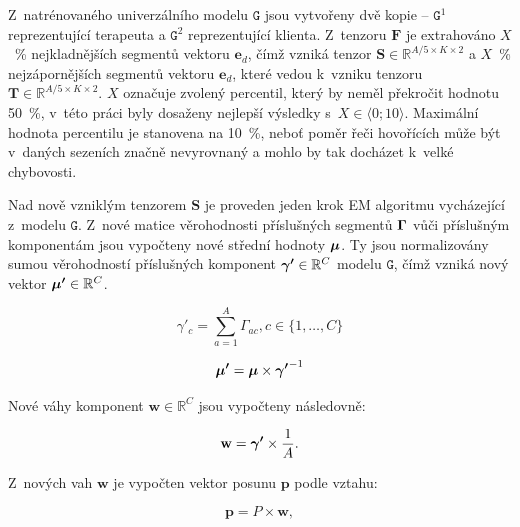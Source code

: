 \begin{enumerate}
    Z~natrénovaného univerzálního modelu $\mathtt{G}$ jsou vytvořeny dvě kopie -- $\mathtt{G}^{1}$ reprezentující terapeuta a $\mathtt{G}^{2}$ reprezentující klienta. Z~tenzoru $\mathbf{F}$ je extrahováno $X$~\% nejkladnějších segmentů vektoru $\mathbf{e}_{d}$, čímž vzniká tenzor $\mathbf{S} \in \mathbb{R}^{A/5 \times K \times 2}$ a $X$~\% nejzápornějších segmentů vektoru $\mathbf{e}_{d}$, které vedou k~vzniku tenzoru $\mathbf{T} \in \mathbb{R}^{A/5 \times K \times 2}$. $X$ označuje zvolený percentil, který by neměl překročit hodnotu 50~\%, v~této práci byly dosaženy nejlepší výsledky s~$X \in \langle 0;10\rangle$. Maximální hodnota percentilu je stanovena na 10~\%, neboť poměr řeči hovořících může být v~daných sezeních značně nevyrovnaný a mohlo by tak docházet k~velké chybovosti. 
    
    Nad nově vzniklým tenzorem $\mathbf{S}$ je proveden jeden krok EM algoritmu vycházející z~modelu $\mathtt{G}$. Z~nové matice věrohodnosti příslušných segmentů $\text{\boldmath$\Gamma$}$ vůči příslušným komponentám jsou vypočteny nové střední hodnoty $\text{\boldmath$\mu$}$. Ty jsou normalizovány sumou věrohodností příslušných komponent $\text{\boldmath$\gamma'$} \in \mathbb{R}^{C}$ modelu $\mathtt{G}$, čímž vzniká nový vektor $\text{\boldmath$\mu'$} \in \mathbb{R}^{C}$.
    
    \begin{equation}
    \label{eqn:Gamma_sum}
       \gamma'_{c} = \sum_{a=1}^{A} \Gamma_{a c} , c \in \{1, \dots, C\}
    \end{equation}
    
    \begin{equation}
    \label{eqn:New_means}
         \text{\boldmath$\mu'$}= \text{\boldmath$\mu$} \times  \text{\boldmath$\gamma'$}^{-1}
    \end{equation}

    Nové váhy komponent $\mathbf{w} \in \mathbb{R}^{C}$ jsou vypočteny následovně:
     
    \begin{equation}
    \label{eqn:New_weights}
        \mathbf{w} = \text{\boldmath$\gamma'$} \times \frac{1}{A}.
    \end{equation}
     
     Z~nových vah $\mathbf{w}$ je vypočten vektor posunu $\mathbf{p}$ podle vztahu:
    
    \begin{equation}
    \label{eqn:Shift_vector}
        \mathbf{p} = P \times \mathbf{w},
    \end{equation}
    

\end{enumerate}
